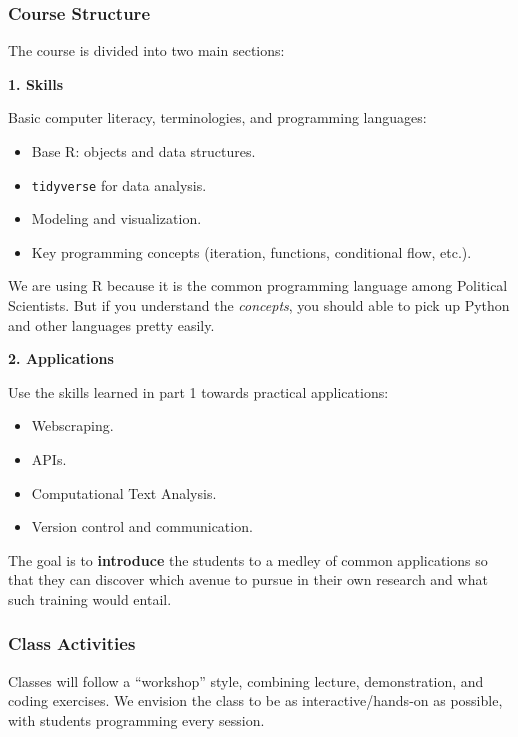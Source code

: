 \documentclass[]{book}
\providecommand{\tightlist}{%
  \setlength{\itemsep}{0pt}\setlength{\parskip}{0pt}}
\begin{document}
\subsubsection*{Course Structure}\label{course-structure}

The course is divided into two main sections:

\textbf{1. Skills}

Basic computer literacy, terminologies, and programming languages:

\begin{itemize}
\tightlist
\item
  Base R: objects and data structures.
\item
  \texttt{tidyverse} for data analysis.
\item
  Modeling and visualization.
\item
  Key programming concepts (iteration, functions, conditional flow,
  etc.).
\end{itemize}

We are using R because it is the common programming language among
Political Scientists. But if you understand the \emph{concepts}, you
should able to pick up Python and other languages pretty easily.

\textbf{2. Applications}

Use the skills learned in part 1 towards practical applications:

\begin{itemize}
\tightlist
\item
  Webscraping.
\item
  APIs.
\item
  Computational Text Analysis.
\item
  Version control and communication.
\end{itemize}

The goal is to \textbf{introduce} the students to a medley of common
applications so that they can discover which avenue to pursue in their
own research and what such training would entail.

\subsubsection*{Class Activities}\label{class-activities}

Classes will follow a ``workshop'' style, combining lecture,
demonstration, and coding exercises. We envision the class to be as
interactive/hands-on as possible, with students programming every
session.
\end{document}
